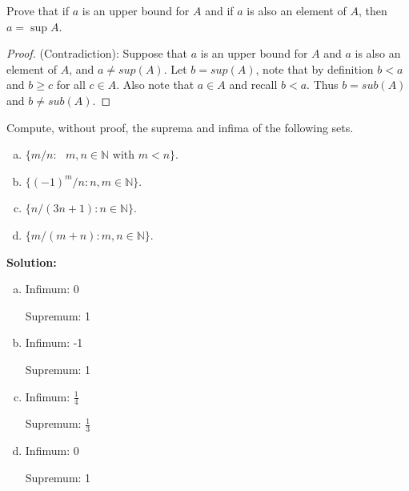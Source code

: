 \documentclass[12pt]{article}
\makeatletter
\theoremstyle{homework}
\newenvironment{exercise}[1]
{\def\@currentlabel{#1}\exercisecore}
{\endexercisecore}
\newcommand{\localhead}[1]{\par\smallskip\noindent\textbf{#1}\nobreak\\}%
\newcommand\solution{\localhead{Solution:}}
\newcommand{\Nats}{\ensuremath{\mathbb N}}
\makeatother
\begin{document}
  \vspace{1in}










\begin{exercise}{1.3.7} Prove that if $a$ is an upper bound for $A$ and if $a$ is also an element of $A$,
then $a=\sup A$.
\end{exercise}
\begin{proof} (Contradiction): Suppose that $a$ is an upper bound for $A$ and $a$ is also an element of $A$, and $a \neq sup(A)$. Let $b = sup(A)$, note that by definition $b < a$ and $b \ge c$ for all $c \in A$. Also note that $a \in A$ and recall $b < a$. Thus $b = sub(A)$  and $b \neq sub(A)$.
\end{proof}
\vspace{1in}






\begin{exercise}{1.3.8} Compute, without proof, the suprema and infima of the 
  following sets.
  \begin{enumerate}[(a)]
  \item $\{m/n: \text{ $m,n\in\Nats$ with $m<n$} \}$.
  \item $\{(-1)^m/n: n,m\in\Nats\}$.
  \item $\{n/(3n+1): n\in\Nats\}$.
  \item $\{m/(m+n):m,n\in\Nats\}$.
  \end{enumerate}
  \end{exercise}
  \solution
  \begin{enumerate}[(a)]
  \item  Infimum: 0  
  
  Supremum: 1
  \item
  Infimum: -1 
  
  Supremum: 1
  \item
  Infimum: $\frac{1}{4}$
  
  Supremum: $\frac{1}{3}$
  \item
  Infimum: 0  
  
  Supremum: 1
\end{enumerate}
  
\end{document}
